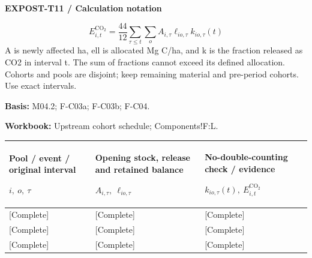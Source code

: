 \textbf{EXPOST-T11 / Calculation notation}\par
{\fontsize{9}{11}\selectfont\[ E^{\mathrm{CO_2}}_{i,t}=\frac{44}{12}\sum_{\tau\le t}\sum_o A_{i,\tau}\ell_{io,\tau}k_{io,\tau}(t) \]}
A is newly affected ha, ell is allocated Mg C/ha, and k is the fraction released as CO2 in interval t. The sum of fractions cannot exceed its defined allocation. Cohorts and pools are disjoint; keep remaining material and pre-period cohorts. Use exact intervals.\par
\textbf{Basis:} M04.2; F-C03a; F-C03b; F-C04.\par
\textbf{Workbook:} Upstream cohort schedule; Components!F:L.\par\endgroup
{\sffamily\fontsize{8.3}{10.3}\selectfont\begin{longtable}{@{}P{54.83mm} P{54.83mm} P{54.83mm}@{}}
\toprule
\textbf{Pool / event / original interval}\par {\normalfont\fontsize{8.2}{10}\selectfont $i,\ o,\ \tau$} & \textbf{Opening stock, release and retained balance}\par {\normalfont\fontsize{8.2}{10}\selectfont $A_{i,\tau},\ \ell_{io,\tau}$} & \textbf{No-double-counting check / evidence}\par {\normalfont\fontsize{8.2}{10}\selectfont $k_{io,\tau}(t),\ E^{\mathrm{CO_2}}_{i,t}$}\\\midrule\endhead
\rule{0pt}{8mm}[Complete] & [Complete] & [Complete]\\\hline
\rule{0pt}{8mm}[Complete] & [Complete] & [Complete]\\\hline
\rule{0pt}{8mm}[Complete] & [Complete] & [Complete]\\\hline
\end{longtable}}
\par\begingroup\sffamily\fontsize{8}{10}\selectfont\color{NEBGreen}\setlength{\parskip}{2pt}\setlength{\abovedisplayskip}{4pt}\setlength{\belowdisplayskip}{4pt}\setlength{\abovedisplayshortskip}{2pt}\setlength{\belowdisplayshortskip}{3pt}
